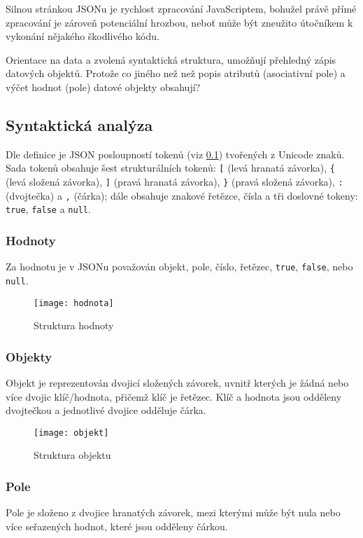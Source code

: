 Silnou stránkou JSONu je rychlost zpracování JavaScriptem, bohužel právě přímé zpracování je zároveň potenciální hrozbou, neboť může být zneužito útočníkem k vykonání nějakého škodlivého kódu.

Orientace na data a zvolená syntaktická struktura, umožňují přehledný zápis datových objektů. Protože co jiného než než popis atributů (asociativní pole) a výčet hodnot (pole) datové objekty obsahují?

\subsection{Syntaktická analýza}
\label{syntaxeJson}
Dle definice \cite{json} je JSON posloupností tokenů (viz \ref{syntaxeJson}) tvořených z Unicode znaků. Sada tokenů obsahuje šest strukturálních tokenů: \texttt{[} (levá hranatá závorka), \texttt{\{} (levá složená závorka), \texttt{]} (pravá hranatá závorka), \texttt{\}} (pravá složená závorka), \texttt{:} (dvojtečka) a \texttt{,} (čárka); dále obsahuje znakové řetězce, čísla a tři doslovné tokeny: \texttt{true}, \texttt{false} a \texttt{null}.

\subsubsection{Hodnoty}
Za hodnotu je v JSONu považován objekt, pole, číslo, řetězec, \texttt{true}, \texttt{false}, nebo \texttt{null}.

\begin{figure}[!htb]
\centering
\texttt{[image: hodnota]}
\caption{Struktura hodnoty}
\label{hodnota}
\end{figure}

\subsubsection{Objekty}
Objekt je reprezentován dvojicí složených závorek, uvnitř kterých je žádná nebo více dvojic klíč/hodnota, přičemž klíč je řetězec. Klíč a hodnota jsou odděleny dvojtečkou a jednotlivé dvojice odděluje čárka.

\begin{figure}[!htb]
\centering
\texttt{[image: objekt]}
\caption{Struktura objektu}
\label{objekt}
\end{figure}

\subsubsection{Pole}
Pole je složeno z dvojice hranatých závorek, mezi kterými může být nula nebo více seřazených hodnot, které jsou odděleny čárkou.

